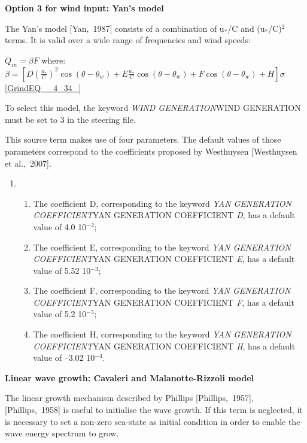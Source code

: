 {\bf  Option 3 for wind input: Yan's model}

 The Yan's model [Yan,~1987] consists of a combination of u${}_{*}$/C and (u${}_{*}$/C)${}^{2}$ terms. It is valid over a wide range of frequencies and wind speeds:

$Q_{in} =\beta F$  where: $\beta =\left[D\left(\frac{u_{*} }{C} \right)^{2} \cos (\theta -\theta _{w} )+E\frac{u_{*} }{C} \cos (\theta -\theta _{w} )+F\cos (\theta -\theta _{w} )+H\right]\sigma $\textbf{ }\eqref{GrindEQ__4_34_}\textbf{}

 To select this model, the keyword \textit{WIND GENERATION}WIND GENERATION must be set to 3 in the steering file.

 This source term makes use of four parameters. The default values of those parameters correspond to the coefficients proposed by Westhuysen [Westhuysen et al.,~2007].

\begin{enumerate}
\item \begin{enumerate}
\item  The coefficient D, corresponding to the keyword \textit{YAN GENERATION COEFFICIENT}YAN GENERATION COEFFICIENT\textit{ D}, has a default value of 4.0 10${}^{-2}$;

\item  The coefficient E, corresponding to the keyword \textit{YAN GENERATION COEFFICIENT}YAN GENERATION COEFFICIENT\textit{ E}, has a default value of 5.52 10${}^{-3}$;

\item  The coefficient F, corresponding to the keyword \textit{YAN GENERATION COEFFICIENT}YAN GENERATION COEFFICIENT\textit{ F}, has a default value of 5.2 10${}^{-5}$;

\item  The coefficient H, corresponding to the keyword \textit{YAN GENERATION COEFFICIENT}YAN GENERATION COEFFICIENT\textit{ H}, has a default value of --3.02 10${}^{-4}$.
\end{enumerate}
\end{enumerate}




{\bf  Linear wave growth: Cavaleri and Malanotte-Rizzoli model}

 The linear growth mechanism described by Phillips [Phillips,~1957], [Phillips,~1958] is useful to initialise the wave growth. If this term is neglected, it is necessary to set a non-zero sea-state as initial condition in order to enable the wave energy spectrum to grow.

